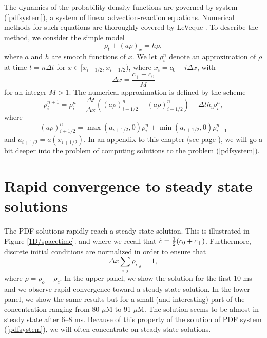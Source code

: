 The dynamics of the probability density functions are governed by system (\ref{pdfsystem}), a system of linear advection-reaction equations. Numerical methods for such equations are thoroughly covered by LeVeque \cite{LeVeque2002}.  
To describe the method, we consider the simple model
\begin{equation}
\rho_{t}+(a\rho)_{x}=h\rho  \label{advectionreaction},
\end{equation}
where $a$ and $h$ are smooth functions of $x$. We let $\rho_{i}^{n}$
denote an approximation of $\rho$ at time $t=n\Delta t$ for $x\in\lbrack
x_{i-1/2},x_{i+1/2})$, where $x_i=c_0+i \Delta x$, with
\[
\Delta x=\frac{c_+-c_0}{M}
\] 
for an integer $M>1$. The
numerical approximation is defined by the scheme%
\begin{equation}
\rho_{i}^{n+1}=\rho_{i}^{n}-\frac{\Delta t}{\Delta x}\left(  \left(
a\rho\right)  _{i+1/2}^{n}-\left(  a\rho\right)  _{i-1/2}^{n}\right)  +\Delta
th_{i}\rho_{i}^{n}, \label{eq:scheme}%
\end{equation}
where%
\begin{equation}
\left(  a\rho\right)  _{i+1/2}^{n}=\max(a_{i+1/2},0)\rho_{i}^{n}%
+\min(a_{i+1/2},0)\rho_{i+1}^{n} \label{eq:flux}%
\end{equation}
and $a_{i+1/2}=a(x_{i+1/2})$.
In an appendix to this chapter (see page \pageref{appendix_hyp}), we will go a bit deeper into the problem of computing solutions to the problem (\ref{pdfsystem}).





\section{Rapid convergence to steady state solutions \label{sec:rapid}} 

The PDF solutions rapidly reach a steady state solution. This is illustrated in Figure \ref{1D/spacetime}.  
 and where
we recall that $\tilde{c}=\frac{1}{2} (c_0+c_+)$.
 Furthermore, discrete initial conditions are normalized in order to ensure that
\begin{equation}
\Delta x \sum_{i,j}  \rho_{i,j}=1,  \label{discrete_sumone_1}
\end{equation}
where $\rho=\rho_{o}+\rho_{c}$.  In the upper panel, we show the solution for the first 10 ms and we observe rapid convergence toward a steady state solution. In the lower panel, we show the same results but for a small (and interesting) part of the concentration ranging from 80 $\mu$M to 91 $\mu$M. The solution seems to be almost in steady state after 6--8 ms. Because of this property of the solution of PDF system (\ref{pdfsystem}), we will often concentrate on steady state solutions. 

